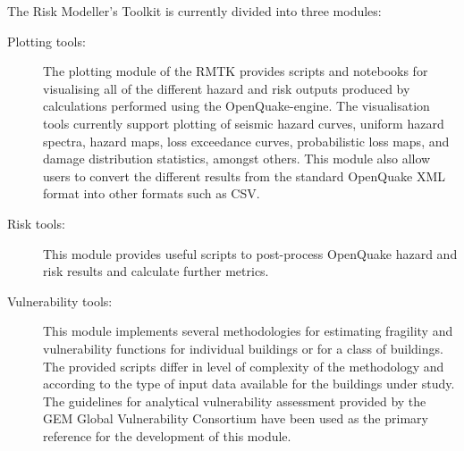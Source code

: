 The Risk Modeller's Toolkit is currently divided into three modules:
\begin{description}
\item[Plotting tools:] The plotting module of the RMTK provides scripts and notebooks for visualising all of the different hazard and risk outputs produced by calculations performed using the OpenQuake-engine. The visualisation tools currently support plotting of seismic hazard curves, uniform hazard spectra, hazard maps, loss exceedance curves, probabilistic loss maps, and damage distribution statistics, amongst others. This module also allow users to convert the different results from the standard OpenQuake XML format into other formats such as CSV.
\item[Risk tools:] This module provides useful scripts to post-process OpenQuake hazard and risk results and calculate further metrics.
\item[Vulnerability tools:] This module implements several methodologies for estimating fragility and vulnerability functions for individual buildings or for a class of buildings. The provided scripts differ in level of complexity of the methodology and according to the type of input data available for the buildings under study. The guidelines for analytical vulnerability assessment provided by the GEM Global Vulnerability Consortium have been used as the primary reference for the development of this module.
\end{description}

